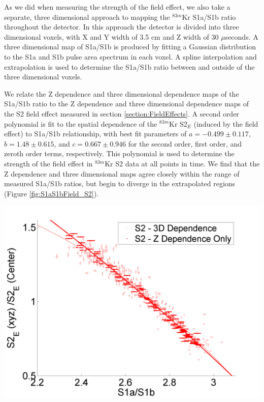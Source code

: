 As we did when measuring the strength of the field effect, we also take a separate, three dimensional approach to mapping the $^{83m}$Kr S1a/S1b ratio throughout the detector. In this approach the detector is divided into three dimensional voxels, with X and Y width of 3.5 cm and Z width of 30 $\mu$seconds.  A three dimensional map of S1a/S1b is produced by fitting a Gaussian distribution to the S1a and S1b pulse area spectrum in each voxel.  A spline interpolation and extrapolation is used to determine the S1a/S1b ratio between and outside of the three dimensional voxels.

We relate the Z dependence and three dimensional dependence maps of the S1a/S1b ratio to the Z dependence and three dimensional dependence maps of the S2 field effect measured in section \ref{section:FieldEffects}.  A second order polynomial is fit to the spatial dependence of the $^{83m}$Kr S2$_E$ (induced by the field effect) to S1a/S1b relationship, with best fit parameters of $a=-0.499 \pm 0.117$,$b=1.48 \pm 0.615$, and $c=0.667 \pm 0.946$ for the second order, first order, and zeroth order terms, respectively. This polynomial is used to determine the strength of the field effect in $^{83m}$Kr S2 data at all points in time.  We find that the Z dependence and three dimensional maps agree closely within the range of measured S1a/S1b ratios, but begin to diverge in the extrapolated regions (Figure \ref{fig:S1aS1bField_S2}). 

\begin{center}
\includegraphics[scale=0.4]{Run04Corrections/S1aS1bvField_ZDep_3D_S2Only.png}
 \label{fig:S1aS1bField_S2}
\end{center}

